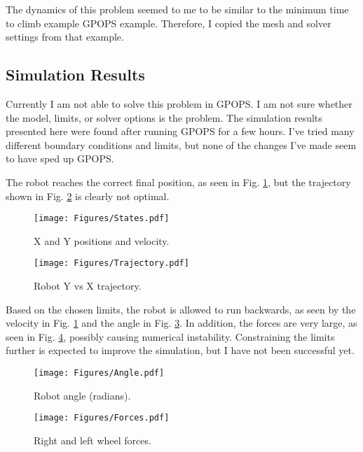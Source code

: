 \documentclass[12pt]{article}
\numberwithin{equation}{section} %
\numberwithin{figure}{section} %
\begin{document}
The dynamics of this problem seemed to me to be similar to the minimum time to climb example GPOPS example. Therefore, I copied the mesh and solver settings from that example.

\subsection{Simulation Results}
\label{sec:SimResults}

Currently I am not able to solve this problem in GPOPS. I am not sure whether the model, limits, or solver options is the problem. The simulation results presented here were found after running GPOPS for a few hours. I've tried many different boundary conditions and limits, but none of the changes I've made seem to have sped up GPOPS.

The robot reaches the correct final position, as seen in Fig. \ref{fig:States}, but the trajectory shown in Fig. \ref{fig:Trajectory} is clearly not optimal.

\begin{figure}[h!]
	\texttt{[image: Figures/States.pdf]}
	\centering
	\caption{X and Y positions and velocity.}
	\label{fig:States}
\end{figure}

\begin{figure}[h!]
	\texttt{[image: Figures/Trajectory.pdf]}
	\centering
	\caption{Robot Y vs X trajectory.}
	\label{fig:Trajectory}
\end{figure}

Based on the chosen limits, the robot is allowed to run backwards, as seen by the velocity in Fig. \ref{fig:States} and the angle in Fig. \ref{fig:Angle}. In addition, the forces are very large, as seen in Fig. \ref{fig:Forces}, possibly causing numerical instability. Constraining the limits further is expected to improve the simulation, but I have not been successful yet.

\begin{figure}[h!]
	\texttt{[image: Figures/Angle.pdf]}
	\centering
	\caption{Robot angle (radians).}
	\label{fig:Angle}
\end{figure}

\begin{figure}[h!]
	\texttt{[image: Figures/Forces.pdf]}
	\centering
	\caption{Right and left wheel forces.}
	\label{fig:Forces}
\end{figure}

%
%
	
\end{document}
